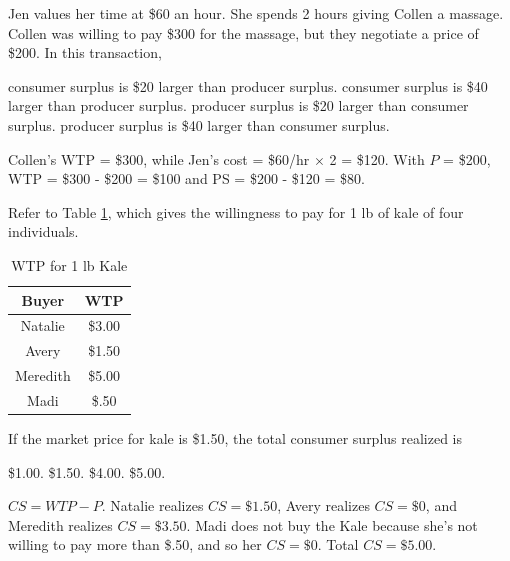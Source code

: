 \documentclass[addpoints,11pt]{exam}
\theoremstyle{definition}
\begin{document}
\begin{questions}
	
	\question Jen values her time at \$60 an hour. She spends 2 hours giving Collen a massage. Collen was willing to pay \$300 for the massage, but they negotiate a price of \$200. In this transaction,
	
	\begin{choices}
		\CorrectChoice consumer surplus is \$20 larger than producer surplus.
		\choice consumer surplus is \$40 larger than producer surplus.
		\choice producer surplus is \$20 larger than consumer surplus.
		\choice producer surplus is \$40 larger than consumer surplus.
	\end{choices}
	
	\begin{solution}
		Collen's WTP = \$300, while Jen's cost = \$60/hr $\times$ 2 = \$120. With $P$ = \$200, WTP = \$300 - \$200 = \$100 and PS = \$200 - \$120 = \$80.
	\end{solution}



	\question Refer to Table \ref{wtp}, which gives the willingness to pay for 1 lb of kale of four individuals.
	
	\begin{table}[H]
		\caption{WTP for 1 lb Kale}
		\label{wtp}
		\centering
		\begin{tabular}{  c| c    }    
			
			Buyer   & WTP \\
			\hline
			Natalie & \$3.00 \\
			Avery & \$1.50 \\
			Meredith & \$5.00 \\
			Madi & \$.50 \\
		\end{tabular}
		
	\end{table} 
	
	If the market price for kale is \$1.50, the total consumer surplus realized is
	
	\begin{choices}
		\choice \$1.00.
		\choice \$1.50.
		\choice \$4.00.
		\CorrectChoice \$5.00.
	\end{choices}
	
	\begin{solution}
		$CS = WTP - P$. Natalie realizes $CS = \$1.50$, Avery realizes $CS = \$0$, and Meredith realizes $CS = \$3.50$. Madi does not buy the Kale because she's not willing to pay more than \$.50, and so her $CS = \$0$. Total $CS = \$5.00$.
	\end{solution}
	

\end{questions}
\end{document}
